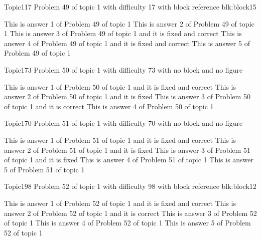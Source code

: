 \documentclass[master]{exam}
\begin{document}
\begin{problem}[requires=blk:block15]{Topic1}{17}
	Problem 49 of topic 1 with difficulty 17 with block reference blk:block15
	\begin{answers}
		\answer This is answer 1 of Problem 49 of topic 1 
		\answer This is answer 2 of Problem 49 of topic 1 
		 This is answer 3 of Problem 49 of topic 1 and it is fixed and correct
		 This is answer 4 of Problem 49 of topic 1 and it is fixed and correct
		\answer This is answer 5 of Problem 49 of topic 1 
	\end{answers}
\end{problem}

\begin{problem}{Topic1}{73}
	Problem 50 of topic 1 with difficulty 73 with no block and no figure
	\begin{answers}
		 This is answer 1 of Problem 50 of topic 1 and it is fixed and correct
		\answer[fixed] This is answer 2 of Problem 50 of topic 1 and it is fixed
		\answer[correct] This is answer 3 of Problem 50 of topic 1 and it is correct
		\answer This is answer 4 of Problem 50 of topic 1 
	\end{answers}
\end{problem}

\begin{problem}{Topic1}{70}
	Problem 51 of topic 1 with difficulty 70 with no block and no figure
	\begin{answers}
		 This is answer 1 of Problem 51 of topic 1 and it is fixed and correct
		\answer[fixed] This is answer 2 of Problem 51 of topic 1 and it is fixed
		\answer[fixed] This is answer 3 of Problem 51 of topic 1 and it is fixed
		\answer This is answer 4 of Problem 51 of topic 1 
		\answer This is answer 5 of Problem 51 of topic 1 
	\end{answers}
\end{problem}

\begin{problem}[requires=blk:block12]{Topic1}{98}
	Problem 52 of topic 1 with difficulty 98 with block reference blk:block12
	\begin{answers}
		 This is answer 1 of Problem 52 of topic 1 and it is fixed and correct
		\answer[correct] This is answer 2 of Problem 52 of topic 1 and it is correct
		\answer This is answer 3 of Problem 52 of topic 1 
		\answer This is answer 4 of Problem 52 of topic 1 
		\answer This is answer 5 of Problem 52 of topic 1 
	\end{answers}
\end{problem}
\end{document}
